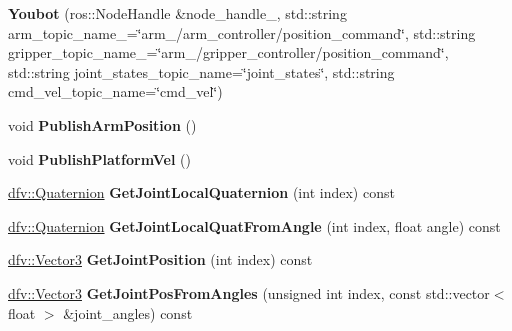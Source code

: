 \begin{DoxyCompactItemize}
\item 
\hypertarget{classdfv_1_1Youbot_a7bef60e35a117942f345b07f19a09e1b}{{\bfseries \-Youbot} (ros\-::\-Node\-Handle \&node\-\_\-handle\-\_\-, std\-::string arm\-\_\-topic\-\_\-name\-\_\-=\char`\"{}arm\-\_/arm\-\_\-controller/position\-\_\-command\char`\"{}, std\-::string gripper\-\_\-topic\-\_\-name\-\_\-=\char`\"{}arm\-\_/gripper\-\_\-controller/position\-\_\-command\char`\"{}, std\-::string joint\-\_\-states\-\_\-topic\-\_\-name=\char`\"{}joint\-\_\-states\char`\"{}, std\-::string cmd\-\_\-vel\-\_\-topic\-\_\-name=\char`\"{}cmd\-\_\-vel\char`\"{})}\label{classdfv_1_1Youbot_a7bef60e35a117942f345b07f19a09e1b}

\item 
\hypertarget{classdfv_1_1Youbot_a9aefad604da0d465dadaf4ab923a089c}{void {\bfseries \-Publish\-Arm\-Position} ()}\label{classdfv_1_1Youbot_a9aefad604da0d465dadaf4ab923a089c}

\item 
\hypertarget{classdfv_1_1Youbot_a72ecbf08b87d31f35384d2712d5273ae}{void {\bfseries \-Publish\-Platform\-Vel} ()}\label{classdfv_1_1Youbot_a72ecbf08b87d31f35384d2712d5273ae}

\item 
\hypertarget{classdfv_1_1Youbot_aff3bcde6d3e88c59451004471e37b4ca}{\hyperlink{classdfv_1_1Quaternion}{dfv\-::\-Quaternion} {\bfseries \-Get\-Joint\-Local\-Quaternion} (int index) const }\label{classdfv_1_1Youbot_aff3bcde6d3e88c59451004471e37b4ca}

\item 
\hypertarget{classdfv_1_1Youbot_aa296d0281fc1c9c00ebea6cd1367c9ea}{\hyperlink{classdfv_1_1Quaternion}{dfv\-::\-Quaternion} {\bfseries \-Get\-Joint\-Local\-Quat\-From\-Angle} (int index, float angle) const }\label{classdfv_1_1Youbot_aa296d0281fc1c9c00ebea6cd1367c9ea}

\item 
\hypertarget{classdfv_1_1Youbot_ad36241fa6b5c2bed6166a9102c709be1}{\hyperlink{classdfv_1_1Vector3}{dfv\-::\-Vector3} {\bfseries \-Get\-Joint\-Position} (int index) const }\label{classdfv_1_1Youbot_ad36241fa6b5c2bed6166a9102c709be1}

\item 
\hypertarget{classdfv_1_1Youbot_a8cd5e38e039cc50fe0f93a9344d727e4}{\hyperlink{classdfv_1_1Vector3}{dfv\-::\-Vector3} {\bfseries \-Get\-Joint\-Pos\-From\-Angles} (unsigned int index, const std\-::vector$<$ float $>$ \&joint\-\_\-angles) const }\label{classdfv_1_1Youbot_a8cd5e38e039cc50fe0f93a9344d727e4}


\end{DoxyCompactItemize}

